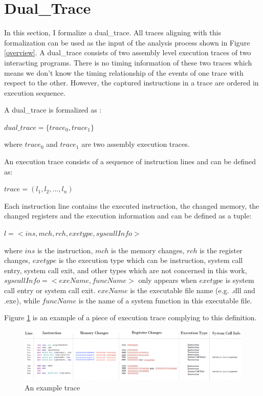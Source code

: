 \section{Dual\_Trace}\label{dualtrace}
In this section, I formalize a dual\_trace. All traces aligning with this formalization can be used as the input of the analysis process shown in Figure \ref{overview}. A dual\_trace consists of two assembly level execution traces of two interacting programs. There is no timing information of these two traces which means we don't know the timing relationship of the events of one trace with respect to the other. However, the captured instructions in a trace are ordered in execution sequence. 

A dual\_trace is formalized as :

$dual\_trace = \lbrace trace_0, trace_1\rbrace$

where $trace_0$ and $trace_1$ are two assembly execution traces.

An execution trace consists of a sequence of instruction lines and can be defined as: 

$ trace = (l_1, l_2, ..., l_n)$ 

Each instruction line contains the executed instruction, the changed memory, the changed registers and the execution information and can be defined as a tuple:

$l = <ins, mch, rch, exetype, syscallInfo>$

where $ins$ is the instruction, $mch$ is the memory changes, $rch$ is the register changes, $exetype$ is the execution type which can be instruction, system call entry, system call exit, and other types which are not concerned in this work, $syscallInfo = <exeName, funcName>$ only appears when $exetype$ is system call entry or system call exit. $exeName$ is the executable file name (e.g. .dll and .exe), while $funcName$ is the name of a system function in this executable file.

Figure \ref{tracedefined} is an example of a piece of execution trace complying to this definition. 

\begin{figure}[H]
\centerline{\includegraphics[scale=0.45]{Figures/tracedefined}}
\caption{An example trace }
\label{tracedefined}
\end{figure}



